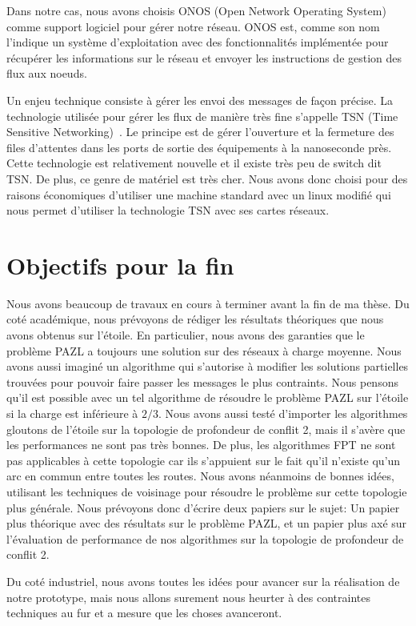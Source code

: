 \documentclass{article}
\begin{document}
Dans notre cas, nous avons choisis ONOS (Open Network Operating System)~\cite{onosref} comme support logiciel pour gérer notre réseau. ONOS est, comme son nom l'indique un système d'exploitation avec des fonctionnalités implémentée pour récupérer les informations sur le réseau et envoyer les instructions de gestion des flux aux noeuds.

Un enjeu technique consiste à gérer les envoi des messages de façon précise. La technologie utilisée pour gérer les flux de manière très fine s'appelle TSN (Time Sensitive Networking)~\cite{ieee802}. Le principe est de gérer l'ouverture et la fermeture des files d'attentes dans les ports de sortie des équipements à la nanoseconde près. Cette technologie est relativement nouvelle et il existe très peu de switch dit TSN. De plus, ce genre de matériel est très cher. Nous avons donc choisi pour des raisons économiques d'utiliser une machine standard avec un linux modifié qui nous permet d'utiliser la technologie TSN avec ses cartes réseaux.


\section{Objectifs pour la fin}

Nous avons beaucoup de travaux en cours à terminer avant la fin de ma thèse. Du coté académique, nous prévoyons de rédiger les résultats théoriques que nous avons obtenus sur l'étoile. En particulier, nous avons des garanties que le problème PAZL a toujours une solution sur des réseaux à charge moyenne. Nous avons aussi imaginé un algorithme qui s'autorise à modifier les solutions partielles trouvées pour pouvoir faire passer les messages le plus contraints. Nous pensons qu'il est possible avec un tel algorithme de résoudre le problème PAZL sur l'étoile si la charge est inférieure à $2/3$.
Nous avons aussi testé d'importer les algorithmes gloutons de l'étoile sur la topologie de profondeur de conflit 2, mais il s'avère que les performances ne sont pas très bonnes.  De plus, les algorithmes FPT ne sont pas applicables à cette topologie car ils s'appuient sur le fait qu'il n'existe qu'un arc en commun entre toutes les routes.
Nous avons néanmoins de bonnes idées, utilisant les techniques de voisinage pour résoudre le problème sur cette topologie plus générale.
Nous prévoyons donc d'écrire deux papiers sur le sujet: Un papier plus théorique avec des résultats sur le problème PAZL, et un papier plus axé sur l'évaluation de performance de nos algorithmes sur la topologie de profondeur de conflit 2.

Du coté industriel, nous avons toutes les idées pour avancer sur la réalisation de notre prototype, mais nous allons surement nous heurter à des contraintes techniques au fur et a mesure que les choses avanceront.




\end{document}
